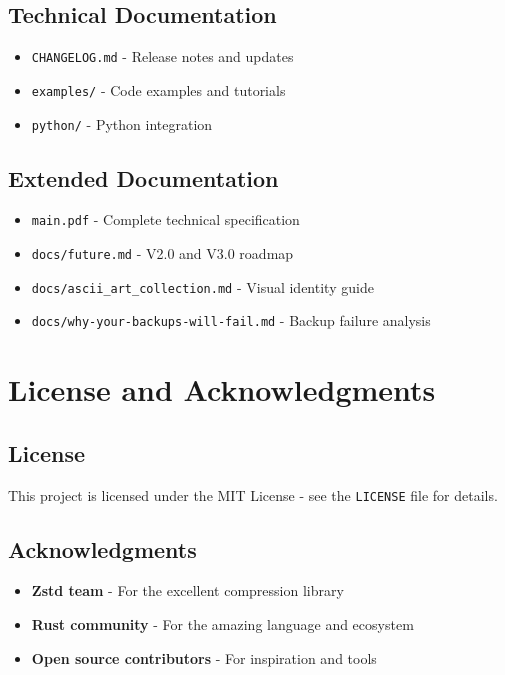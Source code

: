 \documentclass[11pt,a4paper]{article}
\begin{document}
	\subsection{Technical Documentation}
	\begin{itemize}
		\item \texttt{CHANGELOG.md} - Release notes and updates
		\item \texttt{examples/} - Code examples and tutorials
		\item \texttt{python/} - Python integration
	\end{itemize}

	\subsection{Extended Documentation}
	\begin{itemize}
		\item \texttt{main.pdf} - Complete technical specification
		\item \texttt{docs/future.md} - V2.0 and V3.0 roadmap
		\item \texttt{docs/ascii\_art\_collection.md} - Visual identity guide
		\item \texttt{docs/why-your-backups-will-fail.md} - Backup failure analysis
	\end{itemize}

	\section{License and Acknowledgments}
	\label{sec:license}

	\subsection{License}
	This project is licensed under the MIT License - see the \texttt{LICENSE} file for details.

	\subsection{Acknowledgments}
	\begin{itemize}
		\item \textbf{Zstd team} - For the excellent compression library
		\item \textbf{Rust community} - For the amazing language and ecosystem
		\item \textbf{Open source contributors} - For inspiration and tools
	\end{itemize}
\end{document}
